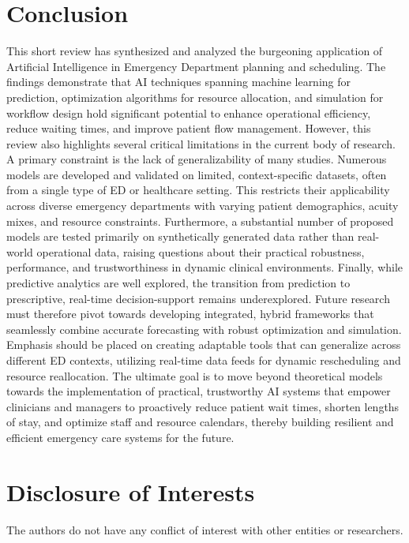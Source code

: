 \documentclass[runningheads]{llncs}
\begin{document}
\section{Conclusion}
This short review has synthesized and analyzed the burgeoning application of Artificial Intelligence in Emergency Department planning and scheduling. The findings demonstrate that AI techniques spanning machine learning for prediction, optimization algorithms for resource allocation, and simulation for workflow design hold significant potential to enhance operational efficiency, reduce waiting times, and improve patient flow management.
However, this review also highlights several critical limitations in the current body of research. A primary constraint is the lack of generalizability of many studies. Numerous models are developed and validated on limited, context-specific datasets, often from a single type of ED or healthcare setting. This restricts their applicability across diverse emergency departments with varying patient demographics, acuity mixes, and resource constraints. Furthermore, a substantial number of proposed models are tested primarily on synthetically generated data rather than real-world operational data, raising questions about their practical robustness, performance, and trustworthiness in dynamic clinical environments.
Finally, while predictive analytics are well explored, the transition from prediction to prescriptive, real-time decision-support remains underexplored. Future research must therefore pivot towards developing integrated, hybrid frameworks that seamlessly combine accurate forecasting with robust optimization and simulation. Emphasis should be placed on creating adaptable tools that can generalize across different ED contexts, utilizing real-time data feeds for dynamic rescheduling and resource reallocation. The ultimate goal is to move beyond theoretical models towards the implementation of practical, trustworthy AI systems that empower clinicians and managers to proactively reduce patient wait times, shorten lengths of stay, and optimize staff and resource calendars, thereby building resilient and efficient emergency care systems for the future.

\section*{Disclosure of Interests}
\begin{normalsize}
The authors do not have any conflict of interest with other entities or researchers.
\end{normalsize}



\end{document}
